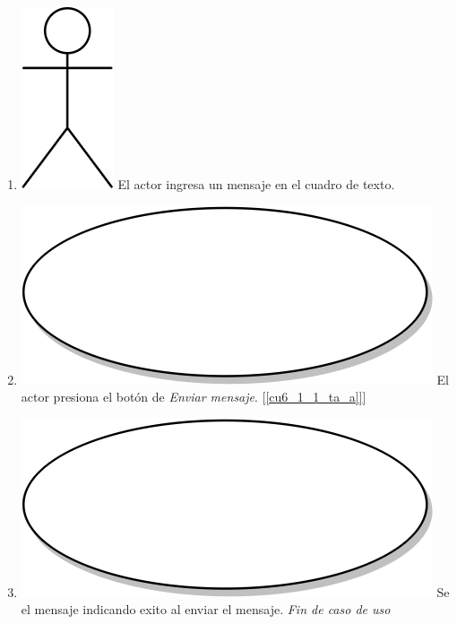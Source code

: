 \begin{enumerate}
\item {\includegraphics[scale=.1]{Capitulo3/img/actor.png} El actor ingresa un mensaje en el cuadro de texto.}
\item {\includegraphics[scale=.05]{Capitulo3/img/proceso.png} El actor presiona el botón de \textit{Enviar mensaje}. [\ref{cu6_1_1_ta_a]}]}
\item {\includegraphics[scale=.05]{Capitulo3/img/proceso.png} Se el mensaje indicando exito al enviar el mensaje.}
  \textit{Fin de caso de uso} \\  
\end{enumerate}

